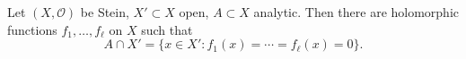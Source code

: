 Let $(X, \mathcal{O})$ be Stein, $X' \subset X$ open, $A \subset X$ analytic. Then there are holomorphic functions $f_1, \ldots, f_\ell$ on $X$ such that
$$A \cap X' = \{x \in X' : f_1(x) = \cdots = f_\ell(x) = 0\}.$$
